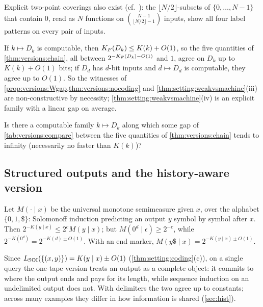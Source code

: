 Explicit two-point coverings also exist (cf.\ \citealp{kleitman1973families}): the $\lfloor N/2\rfloor$-subsets of $\{0,\dots,N-1\}$ that contain $0$, read as $N$ functions on $\binom{N-1}{\lfloor N/2\rfloor-1}$ inputs, show all four label patterns on every pair of inputs.

\begin{remark}\label{rem:versions:noncomputable}
If $k\mapsto D_k$ is computable, then $K_{F}(D_k)\le K(k)+O(1)$, so the five quantities of \cref{thm:versions:chain}, all between $2^{-K_{F}(D_k)-O(1)}$ and $1$, agree on $D_k$ up to $K(k)+O(1)$ bits; if $D_d$ has $d$-bit inputs and $d\mapsto D_d$ is computable, they agree up to $O(1)$. So the witnesses of \cref{prop:versions:Wgap,thm:versions:nocoding} and \cref{thm:setting:weakvsmachine}(iii) are non-constructive by necessity; \cref{thm:setting:weakvsmachine}(iv) is an explicit family with a linear gap on average.
\end{remark}

\begin{question}\label{q:versions:explicit}
Is there a computable family $k\mapsto D_k$ along which some gap of \cref{tab:versions:compare} between the five quantities of \cref{thm:versions:chain} tends to infinity (necessarily no faster than $K(k)$)?
\end{question}

\subsection{Structured outputs and the history-aware version}\label{app:versions:structured}

\begin{proposition}\label{prop:versions:structured}
Let $M(\cdot\mid x)$ be the universal monotone semimeasure given $x$, over the alphabet $\{0,1,\$\}$: Solomonoff induction predicting an output $y$ symbol by symbol after $x$. Then $2^{-K(y\mid x)}\le2^cM(y\mid x)$; but $M(0^d\mid\epsilon)\ge2^{-c}$, while $2^{-K(0^d)}=2^{-K(d)\pm O(1)}$. With an end marker, $M(y\$\mid x)=2^{-K(y\mid x)\pm O(1)}$.
\end{proposition}

Since $L_{\mathrm{SOI}}(\{(x,y)\})=K(y\mid x)\pm O(1)$ (\cref{thm:setting:coding}(c)), on a single query the one-tape version treats an output as a complete object: it commits to where the output ends and pays for its length, while sequence induction on an undelimited output does not. With delimiters the two agree up to constants; across many examples they differ in how information is shared (\cref{sec:hist}).

